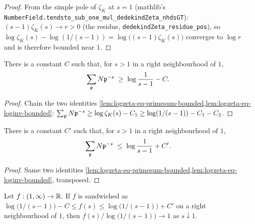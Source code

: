 \begin{proof}
  \leanok
  From the simple pole of $\zeta_K$ at $s=1$ (mathlib's
  \texttt{NumberField.tendsto\_sub\_one\_mul\_dedekindZeta\_nhdsGT}):
  $(s-1)\zeta_K(s) \to r > 0$ (the residue,
  \texttt{dedekindZeta\_residue\_pos}), so
  $\log\zeta_K(s) - \log(1/(s-1)) = \log\bigl((s-1)\zeta_K(s)\bigr)$
  converges to $\log r$ and is therefore bounded near $1$.
\end{proof}

\begin{lemma}\label{lem:prime-zeta-ge-log-minus-bounded}
  There is a constant $C$ such that, for $s>1$ in a right neighbourhood
  of $1$,
  \[
    \sum_{\mathfrak{p}} N\mathfrak{p}^{-s} \;\ge\; \log\frac{1}{s-1} - C.
  \]
\end{lemma}

\begin{proof}
  \leanok
  Chain the two identities
  \cref{lem:logzeta-eq-primesum-bounded,lem:logzeta-eq-loginv-bounded}:
  $\sum_{\mathfrak{p}} N\mathfrak{p}^{-s} \ge \log\zeta_K(s) - C_1 \ge \log(1/(s-1)) - C_1 - C_2$.
\end{proof}

\begin{lemma}\label{lem:prime-zeta-le-log-plus-bounded}
  There is a constant $C'$ such that, for $s>1$ in a right neighbourhood
  of $1$,
  \[
    \sum_{\mathfrak{p}} N\mathfrak{p}^{-s} \;\le\; \log\frac{1}{s-1} + C'.
  \]
\end{lemma}

\begin{proof}
  \leanok
  Same two identities
  \cref{lem:logzeta-eq-primesum-bounded,lem:logzeta-eq-loginv-bounded},
  transposed.
\end{proof}

\begin{lemma}\label{lem:tendsto-ratio-one-of-log-pm-bounded}
  \leanok
  Let $f : (1,\infty) \to \mathbb{R}$. If $f$ is sandwiched as
  $\log\bigl(1/(s-1)\bigr) - C \le f(s) \le \log\bigl(1/(s-1)\bigr) + C'$
  on a right neighbourhood of $1$, then
  $f(s)/\log\bigl(1/(s-1)\bigr) \to 1$ as $s \downarrow 1$.
\end{lemma}

